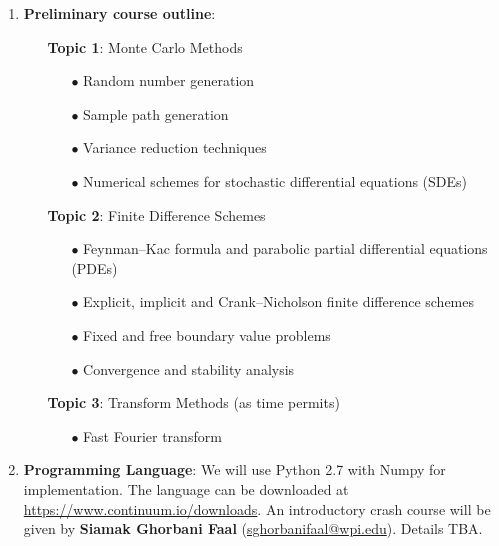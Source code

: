 \documentclass[final, 12pt]{article}
\begin{document}
{\begin{enumerate}
\item
\textbf{Preliminary course outline}:\\
\begin{itemize}
\item[] \textbf{Topic 1}: Monte Carlo Methods\\
\begin{itemize}
	\item[$\bullet$] Random number generation
	\item[$\bullet$] Sample path generation
	\item[$\bullet$] Variance reduction techniques
	\item[$\bullet$] Numerical schemes for stochastic differential equations (SDEs)	
\end{itemize}
\item[] \textbf{Topic 2}: Finite Difference Schemes\\
\begin{itemize}
	\item[$\bullet$] Feynman--Kac formula and parabolic partial differential equations (PDEs)
	\item[$\bullet$] Explicit, implicit and Crank--Nicholson finite difference schemes
	\item[$\bullet$] Fixed and free boundary value problems
	\item[$\bullet$] Convergence and stability analysis
\end{itemize}
\item[] \textbf{Topic 3}: Transform Methods (as time permits)\\
\begin{itemize}
	\item[$\bullet$] Fast Fourier transform
\end{itemize}
\end{itemize}

\vspace{5pt}


\item 
\textbf{Programming Language}: We will use Python 2.7 with Numpy for implementation. The language can be downloaded at \url{https://www.continuum.io/downloads}. An introductory crash course will be given by \textbf{Siamak Ghorbani Faal} (\href{mailto:sghorbanifaal@wpi.edu}{sghorbanifaal@wpi.edu}). Details TBA. %


\vspace{5pt}



\end{enumerate}}
\end{document}
